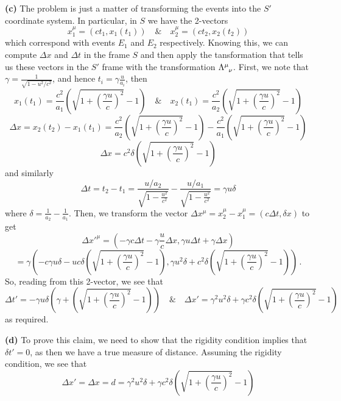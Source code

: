 \documentclass[10pt]{article}
\begin{document}
\textbf{(c)} The problem is just a matter of transforming the events into the $S'$ coordinate system. In particular, in $S$ we have the 2-vectors
\[ x^{\mu}_{1} = (ct_{1}, x_{1}(t_{1})) \quad \& \quad x^{\mu}_{2} = (ct_{2}, x_{2}(t_{2})) \]
which correspond with events $E_{1}$ and $E_{2}$ respectively. Knowing this, we can compute $\Delta x$ and $\Delta t$ in the frame $S$ and then apply the tansformation that tells us these vectors in the $S'$ frame with the transformation $\tensor{\Lambda}{^{\mu}_{\nu}}$. First, we note that $\gamma = \frac{1}{\sqrt{1 - u^{2}/c^{2}}}$, and hence $t_{i} = \gamma\frac{u}{a_{i}}$, then
\[ x_{1}(t_{1}) = \frac{c^{2}}{a_{1}}\left(\sqrt{1 + \left(\frac{\gamma u}{c}\right)^{2}} - 1\right)
\quad \& \quad x_{2}(t_{1}) = \frac{c^{2}}{a_{2}}\left(\sqrt{1 + \left(\frac{\gamma u}{c}\right)^{2}} - 1\right)
\]
\[ \Delta x = x_{2}(t_{2}) - x_{1}(t_{1}) = \frac{c^{2}}{a_{2}}\left(\sqrt{1 + \left(\frac{\gamma u}{c}\right)^{2}} - 1\right) - \frac{c^{2}}{a_{1}}\left(\sqrt{1 + \left(\frac{\gamma u}{c}\right)^{2}} - 1\right) \]
\[ \Delta x = c^{2}\delta\left(\sqrt{1 + \left(\frac{\gamma u}{c}\right)^{2}} - 1\right)\]
and similarly
\[\Delta t = t_{2} - t_{1} = \frac{u/a_{2}}{\sqrt{1 - \frac{u^{2}}{c^{2}}}} - \frac{u/a_{1}}{\sqrt{1 - \frac{u^{2}}{c^{2}}}} = \gamma u \delta \]
where $\delta = \frac{1}{a_{2}} - \frac{1}{a_{1}}$. Then, we transform the vector $\Delta x^{\mu} = x_{2}^{\mu} - x_{1}^{\mu} = (c\Delta t, \delta x)$ to get
\[ \Delta x'^{\mu} = \left(-\gamma c\Delta t - \gamma \frac{u}{c}\Delta x, \gamma u \Delta t + \gamma \Delta x\right) \]
\[ = \gamma \left(
-c\gamma u\delta - uc\delta \left(\sqrt{1 + \left(\frac{\gamma u}{c}\right)^{2}} - 1\right),
\gamma u^{2}\delta + c^{2}\delta\left(\sqrt{1 + \left(\frac{\gamma u}{c}\right)^{2}} - 1\right)
\right) \, .\]
So, reading from this 2-vector, we see that
\[
\Delta t' = -\gamma u\delta\left(\gamma + \left(\sqrt{1 + \left(\frac{\gamma u}{c}\right)^{2}} - 1\right)\right)
\quad \& \quad
\Delta x' = \gamma^{2} u^{2}\delta + \gamma c^{2}\delta\left(\sqrt{1 + \left(\frac{\gamma u}{c}\right)^{2}} - 1\right)
\]
as required.

\textbf{(d)} To prove this claim, we need to show that the rigidity condition implies that $\delta t' = 0$, as then we have a true measure of distance. Assuming the rigidity condition, we see that
\[ \Delta x' = \Delta x = d = \gamma^{2} u^{2}\delta + \gamma c^{2}\delta\left(\sqrt{1 + \left(\frac{\gamma u}{c}\right)^{2}} - 1\right) \]
\end{document}
